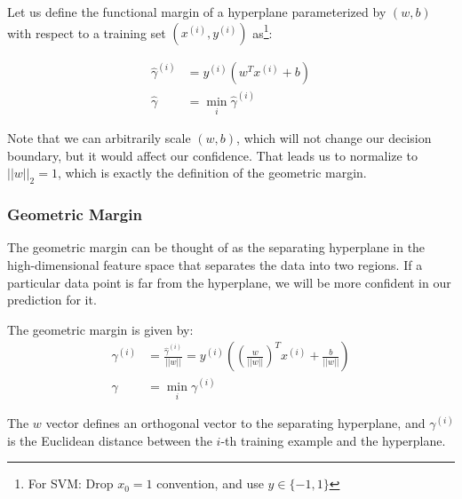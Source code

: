 \documentclass[letterpaper,10pt]{article}
\begin{document}
Let us define the functional margin of a hyperplane parameterized by $(w,b)$ with respect to a training set $(x^{(i)},y^{(i)})$ as\footnote{For SVM: Drop $x_0 = 1$ convention, and use $y\in \{-1, 1\}$}:

\begin{align}
\hat \gamma^{(i)} &= y^{(i)}(w^Tx^{(i)} + b) \\
\hat \gamma &= \min_{i} \hat \gamma^{(i)}
\end{align}

Note that we can arbitrarily scale $(w,b)$, which will not change our decision boundary, but it would affect our confidence. That leads us to normalize to $||w||_2=1$, which is exactly the definition of the geometric margin.

\subsubsection{Geometric Margin}
The geometric margin can be thought of as the separating hyperplane in the high-dimensional feature space that separates the data into two regions. If a particular data point is far from the hyperplane, we will be more confident in our prediction for it.

The geometric margin is given by:
\begin{align}
\gamma^{(i)} &= \frac{\hat \gamma^{(i)}}{||w||} = y^{(i)}\left(\left(\frac{w}{||w||}\right)^Tx^{(i)} + \frac{b}{||w||}\right) \\
\gamma &= \min_{i} \gamma^{(i)}
\end{align}

The $w$ vector defines an orthogonal vector to the separating hyperplane, and $\gamma^{(i)}$ is the Euclidean distance between the $i$-th training example and the hyperplane.
\end{document}
